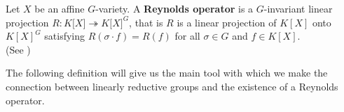 



\begin{definition}
  Let $ X $ be an affine $G$-variety.
  A \textbf{Reynolds operator} is a $ G $-invariant linear projection $R \colon K\lbrack X \rbrack \twoheadrightarrow K\lbrack X \rbrack^G $, that is $R$ is a linear projection of $K[X]$ onto $K[X]^G$ satisfying $R(\sigma\cdot f) = R(f)$ for all $\sigma \in G$ and $f \in K[X]$.  \\
  (See \cite[2.2.2]{DK15})
\end{definition}

The following definition will give us the main tool with which we make the connection between linearly reductive groups and the existence of a Reynolds operator.

